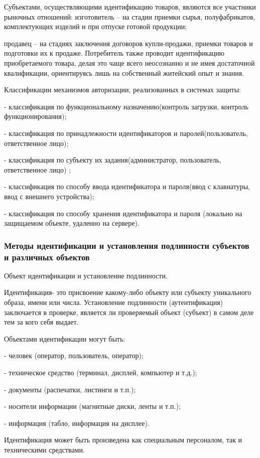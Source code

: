\documentclass[a4paper,12pt]{extarticle}
\begin{document}
	Субъектами, осуществляющими идентификацию товаров, являются все участники рыночных отношений: изготовитель – на стадии приемки сырья, полуфабрикатов, комплектующих изделий и при отпуске готовой продукции;
	
	продавец – на стадиях заключения договоров купли-продажи, приемки товаров и подготовки их к продаже. Потребитель также проводит идентификацию приобретаемого товара, делая это чаще всего неосознанно и не имея достаточной квалификации, ориентируясь лишь на собственный житейский опыт и знания.
	
	Классификации механизмов авторизации, реализованных в системах защиты:
	
	- классификация по функциональному назначению(контроль загрузки, контроль функционирования);
	
	- классификация по принадлежности идентификаторов и паролей(пользователь, ответственное лицо);
	
	- классификация по субъекту их задания(администратор, пользователь, ответственное лицо) ;
	
	- классификация по способу ввода идентификатора и пароля(ввод с клавиатуры, ввод с внешнего устройства);
	
	- классификация по способу хранения идентификатора и пароля (локально на защищаемом объекте, удаленно на сервере). 
	\subsubsection{Методы идентификации и установления подлинности субъектов и различных объектов}
	Объект идентификации и установление подлинности.
	
	Идентификация- это присвоение какому-либо объекту или субъекту уникального образа, имени или числа. Установление подлинности (аутентификация) заключается в проверке, является ли проверяемый объект (субъект) в самом деле тем за кого себя выдает.
	
	Объектами идентификации могут быть:
	
	- человек (оператор, пользователь, оператор);
	
	- техническое средство (терминал, дисплей, компьютер и т.д.);
	
	- документы (распечатки, листинги и т.п.);
	
	- носители информации (магнитные диски, ленты и т.п.);
	
	- информация (табло, информация на дисплее).
	
	Идентификация может быть произведена как специальным персоналом, так и техническими средствами.
	
\end{document}

